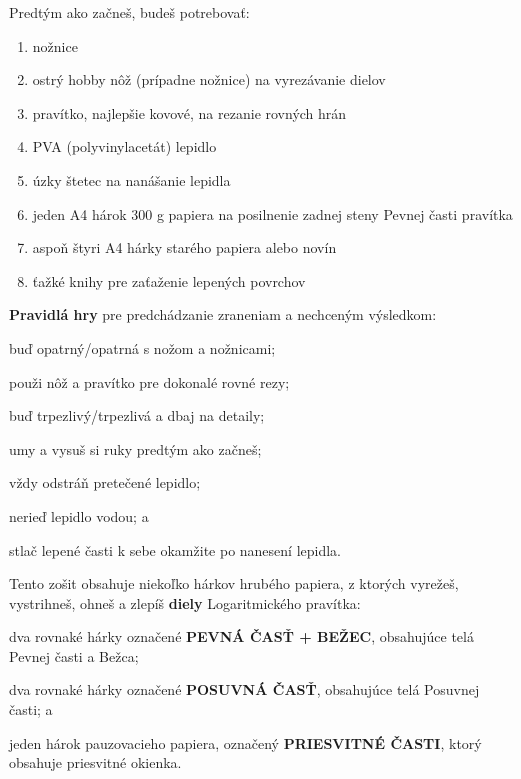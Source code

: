   \begin{multicols*}{3}
  \normalsize{Predtým ako začneš, budeš potrebovať:
    \begin{enumerate}
      \setlength{\parskip}{0pt}
      \setlength{\parsep}{0pt}
      \item nožnice
      \item ostrý hobby nôž (prípadne nožnice) na vyrezávanie dielov
      \item pravítko, najlepšie kovové, na rezanie rovných hrán
      \item PVA (polyvinylacetát) lepidlo
      \item úzky štetec na nanášanie lepidla
      \item jeden A4 hárok 300 g papiera na posilnenie zadnej steny Pevnej časti pravítka
      \item aspoň štyri A4 hárky starého papiera alebo novín
      \item ťažké knihy pre zaťaženie lepených povrchov
    \end{enumerate}

  \textbf{Pravidlá hry} pre predchádzanie zraneniam a nechceným výsledkom:
    \begin{inparaenum}
      \item buď opatrný/opatrná s nožom a nožnicami;
      \item použi nôž a pravítko pre dokonalé rovné rezy;
      \item buď trpezlivý/trpezlivá a dbaj na detaily;
      \item umy a vysuš si ruky predtým ako začneš;
      \item vždy odstráň pretečené lepidlo;
      \item nerieď lepidlo vodou; a
      \item stlač lepené časti k sebe okamžite po nanesení lepidla.
    \end{inparaenum}

  Tento zošit obsahuje niekoľko hárkov hrubého papiera, z ktorých vyrežeš, vystrihneš, ohneš a zlepíš \textbf{diely} Logaritmického pravítka:
    \begin{inparaenum}
      \item dva rovnaké hárky označené \textbf{PEVNÁ ČASŤ + BEŽEC}, obsahujúce telá Pevnej časti a Bežca;
      \item dva rovnaké hárky označené \textbf{POSUVNÁ ČASŤ}, obsahujúce telá Posuvnej časti; a
      \item jeden hárok pauzovacieho papiera, označený \textbf{PRIESVITNÉ ČASTI}, ktorý obsahuje priesvitné okienka.
    \end{inparaenum}

}
\end{multicols*}
